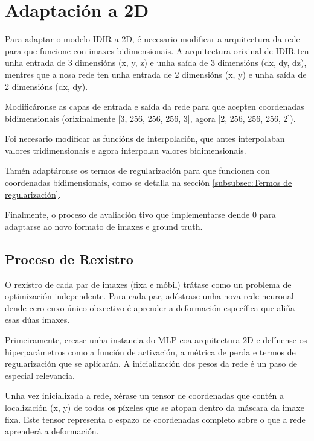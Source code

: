 \section{Adaptación a 2D}
\label{sec:Adaptación a 2D}

Para adaptar o modelo IDIR a 2D, é necesario modificar a arquitectura da rede para que funcione con imaxes bidimensionais.
A arquitectura orixinal de IDIR ten unha entrada de 3 dimensións (x, y, z) e unha saída de 3 dimensións (dx, dy, dz),
mentres que a nosa rede ten unha entrada de 2 dimensións (x, y) e unha saída de 2 dimensións (dx, dy).

Modificáronse as capas de entrada e saída da rede para que acepten coordenadas bidimensionais (orixinalmente [3, 256, 256, 256, 3], agora [2, 256, 256, 256, 2]).

Foi necesario modificar as funcións de interpolación, que antes interpolaban valores tridimensionais e agora interpolan valores bidimensionais.

Tamén adaptáronse os termos de regularización para que funcionen con coordenadas bidimensionais, como se detalla na sección \ref{subsubsec:Termos de regularización}.

Finalmente, o proceso de avaliación tivo que implementarse dende 0 para adaptarse ao novo formato de imaxes e ground truth.

\subsection{Proceso de Rexistro}
\label{subsec:Proceso de Rexistro}

O rexistro de cada par de imaxes (fixa e móbil) trátase como un problema de optimización independente. Para cada par, adéstrase unha nova rede neuronal dende cero cuxo único obxectivo é aprender a deformación específica que aliña esas dúas imaxes.

Primeiramente, crease unha instancia do MLP coa arquitectura 2D e defínense os hiperparámetros como a función de activación, a métrica de perda e termos de regularización que se aplicarán. A inicialización dos pesos da rede é un paso de especial relevancia. 

Unha vez inicializada a rede, xérase un tensor de coordenadas que contén a localización (x, y) de todos os píxeles que se atopan dentro da máscara da imaxe fixa. Este tensor representa o espazo de coordenadas completo sobre o que a rede aprenderá a deformación.

